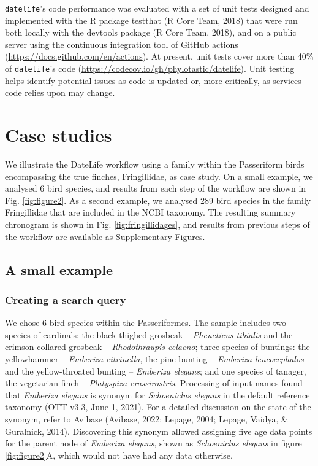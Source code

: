 \documentclass[english,man]{apa6}
\begin{document}
\texttt{datelife}'s code performance was evaluated with a set of unit tests designed and
implemented with the R package testthat (R Core Team, 2018) that were run both locally
with the devtools package (R Core Team, 2018), and on a public server using the continuous integration tool of GitHub actions (\url{https://docs.github.com/en/actions}).
At present, unit tests cover more than 40\% of \texttt{datelife}'s code (\url{https://codecov.io/gh/phylotastic/datelife}).
Unit testing helps identify potential issues as code is updated or, more critically, as services code relies upon may change.

\hypertarget{case-studies}{%
\section{Case studies}\label{case-studies}}

We illustrate the DateLife workflow using a family within the Passeriform birds encompassing the true finches, Fringillidae, as case study. On a small example, we analysed 6 bird species, and results from each step of the workflow are shown in Fig. \ref{fig:figure2}. As a second example, we analysed 289 bird species in the family Fringillidae that are included in the NCBI taxonomy. The resulting summary chronogram is shown in Fig. \ref{fig:fringillidages}, and results from previous steps of the workflow are available as Supplementary Figures.

\hypertarget{a-small-example}{%
\subsection{A small example}\label{a-small-example}}

\hypertarget{creating-a-search-query-1}{%
\subsubsection{Creating a search query}\label{creating-a-search-query-1}}

We chose 6 bird species within the Passeriformes. The sample includes
two species of cardinals:
the black-thighed grosbeak -- \emph{Pheucticus tibialis} and
the crimson-collared grosbeak -- \emph{Rhodothraupis celaeno};
three species of buntings:
the yellowhammer -- \emph{Emberiza citrinella},
the pine bunting -- \emph{Emberiza leucocephalos} and
the yellow-throated bunting -- \emph{Emberiza elegans};
and one species of tanager, the vegetarian finch -- \emph{Platyspiza crassirostris}.
Processing of input names found that \emph{Emberiza elegans} is synonym for \emph{Schoeniclus elegans} in the default reference taxonomy (OTT v3.3, June 1, 2021). For a detailed discussion on the state of the synonym, refer to Avibase (Avibase, 2022; Lepage, 2004; Lepage, Vaidya, \& Guralnick, 2014).
Discovering this synonym allowed assigning five age data points for the parent node of \emph{Emberiza elegans}, shown as \emph{Schoeniclus elegans} in figure \ref{fig:figure2}A, which would not have had any data otherwise.
\end{document}
